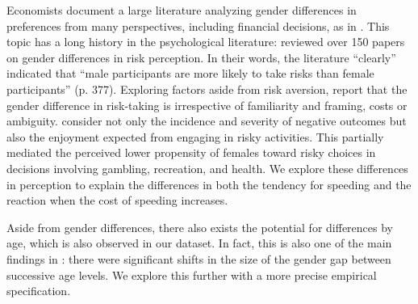 % 
Economists
\citet{crosongneezy2009}
document a large literature 
analyzing gender differences in preferences from many perspectives, 
including financial decisions, as in
\citet{charnessgneezy2012}.   
% 
This topic has a long history in the psychological literature: 
\citet{byrnes1999}
reviewed
over 150 papers on gender differences in risk perception.
In their words, the literature ``clearly'' indicated that
``male participants are more likely to take risks than female
participants'' (p. 377). 
% 
% 
% 
Exploring factors aside from risk aversion, 
\citet{powellansic1997} report that the gender difference in risk-taking 
is irrespective of familiarity and framing, costs or ambiguity. 
% 
\citet{harris2006} 
consider not only the incidence and severity of
negative outcomes but also the enjoyment expected from 
engaging in risky activities. 
This 
partially mediated the perceived lower propensity of females
toward risky choices in decisions involving gambling, recreation, and health. 
We explore these differences in perception to explain 
the differences in both 
the tendency for speeding and 
the reaction when the cost of speeding increases. 



Aside from gender differences, 
there also exists the potential for differences by age, 
which is also observed in our dataset. 
%
In fact, this is also one of the main findings in 
\citet{byrnes1999}: 
there were significant shifts in the size of the gender gap between successive age levels.
% 
We explore this further with a more precise empirical specification. 


